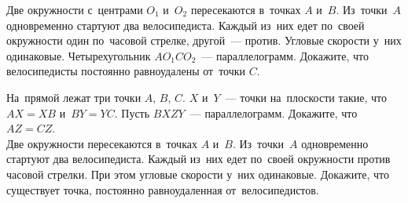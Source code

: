 \begin{problems}
\item
Две окружности с~центрами $O_1$ и~$O_2$ пересекаются в~точках $A$ и~$B$.
Из~точки~$A$ одновременно стартуют два велосипедиста.
Каждый из~них едет по~своей окружности один по~часовой стрелке,
другой~--- против.
Угловые скорости у~них одинаковые.
Четырехугольник $A O_1 C O_2$~--- параллелограмм.
Докажите, что велосипедисты постоянно равноудалены от~точки $C$.

\item
\sp
На~прямой лежат три точки $A$, $B$, $C$.
$X$ и~$Y$~--- точки на~плоскости такие, что $AX = XB$ и~$BY = YC$.
Пусть $BXZY$~--- параллелограмм.
Докажите, что $AZ = CZ$.
\\
\sp
Две окружности пересекаются в~точках $A$ и~$B$.
Из~точки~$A$ одновременно стартуют два велосипедиста.
Каждый из~них едет по~своей окружности против часовой стрелки.
При этом угловые скорости у~них одинаковые.
Докажите, что существует точка, постоянно равноудаленная от~велосипедистов.

\end{problems}

